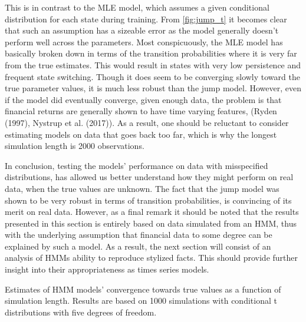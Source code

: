 This is in contrast to the MLE model, which assumes a given conditional distribution for each state during training. From \cref{fig:jump_t} it becomes clear that such an assumption has a sizeable error as the model generally doesn't perform well across the parameters. Most conspicuously, the MLE model has basically broken down in terms of the transition probabilities where it is very far from the true estimates. This would result in states with very low persistence and frequent state switching. Though it does seem to be converging slowly toward the true parameter values, it is much less robust than the jump model. However, even if the model did eventually converge, given enough data, the problem is that financial returns are generally shown to have time varying features, (Ryden (1997), Nystrup et al. (2017)). As a result, one should be reluctant to consider estimating models on data that goes back too far, which is why the longest simulation length is 2000 observations.

In conclusion, testing the models' performance on data with misspecified distributions, has allowed us better understand how they might perform on real data, when the true values are unknown. The fact that the jump model was shown to be very robust in terms of transition probabilities, is convincing of its merit on real data. However, as a final remark it should be noted that the results presented in this section is entirely based on data simulated from an HMM, thus with the underlying assumption that financial data to some degree can be explained by such a model. As a result, the next section will consist of an analysis of HMMs ability to reproduce stylized facts. This should provide further insight into their appropriateness as times series models.

\begin{table}[H]
\centering
\caption{Estimates of HMM models' convergence towards true values as a function of simulation length. Results are based on 1000 simulations with conditional t distributions with five degrees of freedom.}

\end{table}